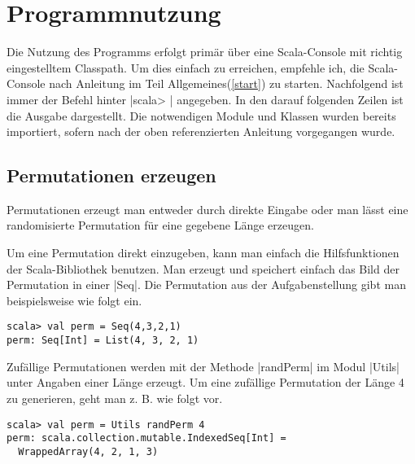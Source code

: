 \section{Programmnutzung}
\lstset{basicstyle=\ttfamily}
Die Nutzung des Programms erfolgt primär über eine Scala-Console mit richtig eingestelltem Classpath.
Um dies einfach zu erreichen, empfehle ich, die Scala-Console nach Anleitung im Teil Allgemeines(\ref{start}) zu starten.
Nachfolgend ist immer der Befehl hinter |scala> | angegeben. In den darauf folgenden Zeilen ist die Ausgabe dargestellt.
Die notwendigen Module und Klassen wurden bereits importiert, sofern nach der oben referenzierten Anleitung vorgegangen wurde.
\subsection{Permutationen erzeugen}
Permutationen erzeugt man entweder durch direkte Eingabe oder man lässt eine randomisierte Permutation für eine gegebene Länge erzeugen.

Um eine Permutation direkt einzugeben, kann man einfach die Hilfsfunktionen der Scala-Bibliothek benutzen.
Man erzeugt und speichert einfach das Bild der Permutation in einer |Seq|. Die Permutation aus der Aufgabenstellung gibt man beispielsweise wie folgt ein.
\begin{lstlisting}
scala> val perm = Seq(4,3,2,1)
perm: Seq[Int] = List(4, 3, 2, 1)  
\end{lstlisting}
Zufällige Permutationen werden mit der Methode |randPerm| im Modul |Utils| unter Angaben einer Länge erzeugt.
Um eine zufällige Permutation der Länge 4 zu generieren, geht man z. B. wie folgt vor.
\begin{lstlisting}
scala> val perm = Utils randPerm 4                                                                                                 
perm: scala.collection.mutable.IndexedSeq[Int] =
  WrappedArray(4, 2, 1, 3)  
\end{lstlisting}
